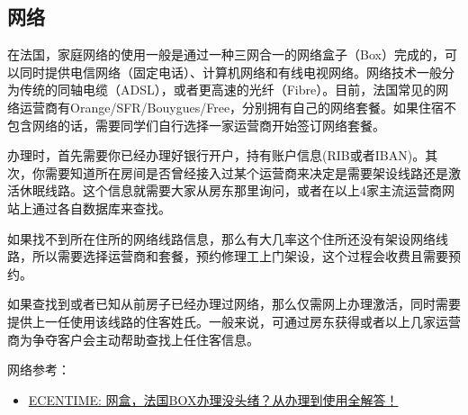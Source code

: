 \subsection{网络}

在法国，家庭网络的使用一般是通过一种三网合一的网络盒子（Box）完成的，可以同时提供电信网络（固定电话）、计算机网络和有线电视网络。网络技术一般分为传统的同轴电缆（ADSL），或者更高速的光纤（Fibre）。目前，法国常见的网络运营商有Orange/SFR/Bouygues/Free，分别拥有自己的网络套餐。如果住宿不包含网络的话，需要同学们自行选择一家运营商开始签订网络套餐。

办理时，首先需要你已经办理好银行开户，持有账户信息(RIB或者IBAN)。其次，你需要知道所在房间是否曾经接入过某个运营商来决定是需要架设线路还是激活休眠线路。这个信息就需要大家从房东那里询问，或者在以上4家主流运营商网站上通过各自数据库来查找。

如果找不到所在住所的网络线路信息，那么有大几率这个住所还没有架设网络线路，所以需要选择运营商和套餐，预约修理工上门架设，这个过程会收费且需要预约。

如果查找到或者已知从前房子已经办理过网络，那么仅需网上办理激活，同时需要提供上一任使用该线路的住客姓氏。一般来说，可通过房东获得或者以上几家运营商为争夺客户会主动帮助查找上任住客信息。

网络参考：
\begin{itemize}
    \item \href{https://www.ecentime.com/article/network-box-in-france}{ECENTIME: 网盒，法国BOX办理没头绪？从办理到使用全解答！}
\end{itemize}
